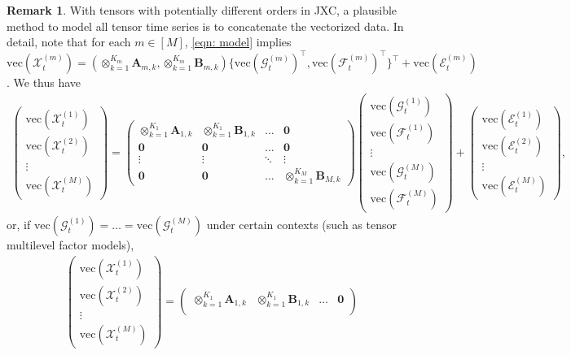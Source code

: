 \documentclass[aos]{imsart}
\theoremstyle{plain}
\theoremstyle{definition}
\newtheorem{remark}{Remark}
\def\cE{\mathcal{E}}
\def\cF{\mathcal{F}}
\def\cG{\mathcal{G}} \def\cH{\boldsymbol{\mathcal{H}}} \def\cI{\mathcal{I}}
\def\cX{\mathcal{X}}
\def\zero{\mathbf{0}}
\def\bA{\mathbf{A}}
\def\bB{\mathbf{B}}
\def\trans{\intercal}
\def\vec{\mathrm{vec}}
\begin{document}
\begin{remark}
With tensors with potentially different orders in JXC, a plausible method to model all tensor time series is to concatenate the vectorized data. In detail, note that for each $m\in[M]$, \eqref{eqn: model} implies $\vec(\cX_t^{(m)}) = (\otimes_{k=1}^{K_m} \bA_{m,k}, \otimes_{k=1}^{K_m} \bB_{m,k}) \big\{ \vec(\cG_t^{(m)})^\trans, \vec(\cF_t^{(m)})^\trans \big\}^\trans + \vec(\cE_t^{(m)})$. We thus have
{\small
\begin{align*}
    \begin{pmatrix}
    \vec(\cX_t^{(1)}) \\ \vec(\cX_t^{(2)}) \\ \vdots \\ \vec(\cX_t^{(M)})
    \end{pmatrix} 
    = \begin{pmatrix}
    \otimes_{k=1}^{K_1} \bA_{1,k} & \otimes_{k=1}^{K_1} \bB_{1,k}  & \ldots & \zero \\
    \zero & \zero &  \ldots & \zero \\
    \vdots & \vdots &  \ddots & \vdots \\
    \zero & \zero &  \ldots & \otimes_{k=1}^{K_M} \bB_{M,k}
    \end{pmatrix} \begin{pmatrix}
    \vec(\cG_t^{(1)}) \\ \vec(\cF_t^{(1)}) \\ \vdots \\ \vec(\cG_t^{(M)}) \\ \vec(\cF_t^{(M)})
    \end{pmatrix} + \begin{pmatrix}
    \vec(\cE_t^{(1)}) \\ \vec(\cE_t^{(2)}) \\ \vdots \\ \vec(\cE_t^{(M)})
    \end{pmatrix} ,
\end{align*}
}
or, if $\vec(\cG_t^{(1)}) =\dots =\vec(\cG_t^{(M)})$ under certain contexts (such as tensor multilevel factor models),
{\small
\begin{align*}
    \begin{pmatrix}
    \vec(\cX_t^{(1)}) \\ \vec(\cX_t^{(2)}) \\ \vdots \\ \vec(\cX_t^{(M)})
    \end{pmatrix} 
    = \begin{pmatrix}
    \otimes_{k=1}^{K_1} \bA_{1,k} & \otimes_{k=1}^{K_1} \bB_{1,k}  & \ldots & \zero \\

\end{pmatrix}
\end{align*}}
\end{remark}
\end{document}
